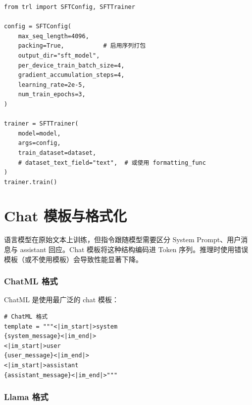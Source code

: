 \begin{examplebox}
\begin{lstlisting}[style=pythonstyle]
from trl import SFTConfig, SFTTrainer

config = SFTConfig(
    max_seq_length=4096,
    packing=True,           # 启用序列打包
    output_dir="sft_model",
    per_device_train_batch_size=4,
    gradient_accumulation_steps=4,
    learning_rate=2e-5,
    num_train_epochs=3,
)

trainer = SFTTrainer(
    model=model,
    args=config,
    train_dataset=dataset,
    # dataset_text_field="text",  # 或使用 formatting_func
)
trainer.train()
\end{lstlisting}
\end{examplebox}

\section{Chat 模板与格式化}
\label{sec:chat-templates}

\begin{intuitionbox}[为何 Chat 模板重要]
语言模型在原始文本上训练，但指令跟随模型需要区分 System Prompt、用户消息与 assistant 回应。Chat 模板将这种结构编码进 Token 序列。推理时使用错误模板（或不使用模板）会导致性能显著下降。
\end{intuitionbox}

\subsubsection*{ChatML 格式}
\label{chatml-format}

ChatML 是使用最广泛的 chat 模板：

\begin{lstlisting}[style=pythonstyle]
# ChatML 格式
template = """<|im_start|>system
{system_message}<|im_end|>
<|im_start|>user
{user_message}<|im_end|>
<|im_start|>assistant
{assistant_message}<|im_end|>"""
\end{lstlisting}

\subsubsection*{Llama 格式}
\label{llama-format}

